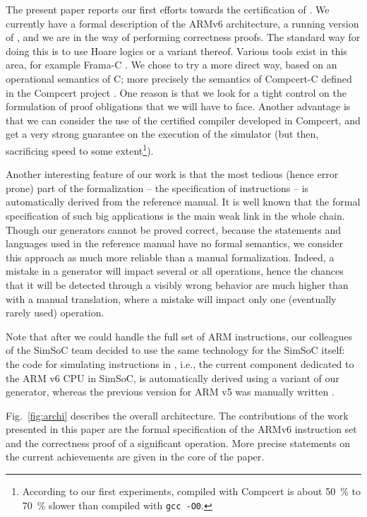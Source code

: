 \smallskip
The present paper reports our first efforts 
towards the certification of \simlight.
We currently have a formal description of the ARMv6 architecture,
a running version of \simlight,
and we are in the way of performing correctness proofs.
The standard way for doing this is to use Hoare logics
or a variant thereof.
Various tools exist in this area, 
for example Frama-C \cite{frama-c}.
We chose to try a more direct way,
based on an operational semantics of C;
more precisely the semantics of Compcert-C defined in the Compcert project
\cite{Leroy-Compcert-CACM}.
One reason
is that we look for a tight control on the formulation of proof obligations
that we will have to face.
Another advantage is that we can consider the use of
the certified compiler developed in Compcert,
and get a very strong guarantee on the execution of 
the simulator (but then, sacrificing speed to some extent\footnote{%
According to our first experiments, \simlight compiled with Compcert
is about 50~\% to 70~\% slower than \simlight compiled with \texttt{gcc -O0}.
}).

Another interesting feature of our work is that 
the most tedious (hence error prone) part of the formalization --
the specification of instructions --
is automatically derived from the reference manual.
It is well known that the formal specification of such big applications
is the main weak link in the whole chain.
Though our generators cannot be proved correct, because the statements
and languages used in the reference manual have no formal semantics,
we consider this approach as much more reliable than a manual formalization.
Indeed, a mistake in a generator will impact several or all operations,
hence the chances that it will be detected through a visibly wrong behavior
are much higher than with a manual translation,
where a mistake will impact only one (eventually rarely used) operation.

Note that after we could handle the full set of ARM instructions,
our colleagues of the SimSoC team decided to use the same technology
for the SimSoC itself:
the code for simulating instructions in \simlight,
i.e., the current component dedicated to the ARM v6 CPU in SimSoC,
is automatically derived using a variant of our generator,
whereas the previous version for ARM v5 was manually written \cite{rapido11}.


Fig.~\ref{fig:archi} describes the overall architecture. 
The contributions of the work presented in this paper are 
the formal specification of the ARMv6 instruction set
and the correctness proof of a significant operation.
More precise statements on the current achievements 
are given in the core of the paper.
 

